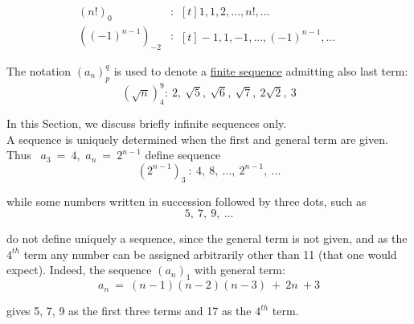 \documentclass[]{amsbook}
\begin{document}

\begin{align*}
    {(n!)_{0}} &:
    \begin{aligned}[t]
        1, 1, 2, ... , n!, ...
    \end{aligned}\\
    ((-1)^{n-1})_{-2} &: 
    \begin{aligned}[t]
        -1, 1, -1, ... , (-1)^{n-1}, ...
    \end{aligned}
\end{align*}

\indent The notation $(a_n)^q_p$ is used to denote a \underline{finite sequence} admitting
also last term:
\begin{equation*}
    (\sqrt{n})^9_4 : \ 2,\ \sqrt{5},\ \sqrt{6},\ \sqrt{7},\ 2\sqrt{2},\ 3
\end{equation*}

\indent In this Section, we discuss briefly infinite sequences only.\\
\indent A sequence is uniquely determined when the first and general term are given. Thus
\ $a_3\ =\ 4$,\ $a_n\ =\ 2^{n-1}$ define sequence
\begin{equation*}
    (2^{n-1})_3\ :\ 4,\ 8,\ ...,\ 2^{n-1},\ ...
\end{equation*}

\noindent while some numbers written in succession followed by three dots, such as
\begin{equation*}
    5,\ 7,\ 9,\ ...
\end{equation*}

\noindent do not define uniquely a sequence, since the general term is not given, and as the 
$4^{th}$ term any number can be assigned arbitrarily other than 11 (that one would expect).
Indeed, the sequence $(a_n)_1$ with general term:
\begin{equation*}
    a_n\ =\ (n-1)(n-2)(n-3)\ +\ 2n\ + 3
\end{equation*}

\noindent gives 5, 7, 9 as the first three terms and 17 as the $4^{th}$ term.
\end{document}
